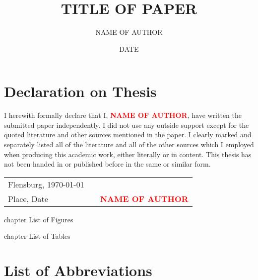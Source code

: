 \documentclass[a4paper, 12pt, bibtotoc, toc=chapterentrywithdots, hyphens]{scrreprt}
\title{TITLE OF PAPER}
\author{NAME OF AUTHOR}
\date{DATE}
\begin{document}
\pagestyle{empty}



\chapter*{Declaration on Thesis}
\thispagestyle{Preamble}

I herewith formally declare that I, \textcolor{red}{\textbf{NAME OF AUTHOR}}, have written the submitted paper independently. I did not use any outside support except for the quoted literature and other sources mentioned in the paper. I clearly marked and separately listed all of the literature and all of the other sources which I employed when producing this academic work, either literally or in content. This thesis has not been handed in or published before in the same or similar form.

\vspace{4cm}

\begin{tabular}[h]{l p{2cm} p{7cm}}
Flensburg, \today &  & \\
\cline{1-1}\cline{3-3}
{\small Place, Date}& & {\small \textcolor{red}{\textbf{NAME OF AUTHOR}}}\\
\end{tabular}


\newpage
{}
\tableofcontents
\thispagestyle{Preamble}

\newpage
\listoffigures
\thispagestyle{Preamble}
 {chapter} {List of Figures}

\newpage
\listoftables
\thispagestyle{Preamble}
 {chapter} {List of Tables}

\newpage
\chapter*{List of Abbreviations}
\thispagestyle{Preamble}

\begin{acronym}[\hspace{3.5cm}]
\end{acronym}
\end{document}
